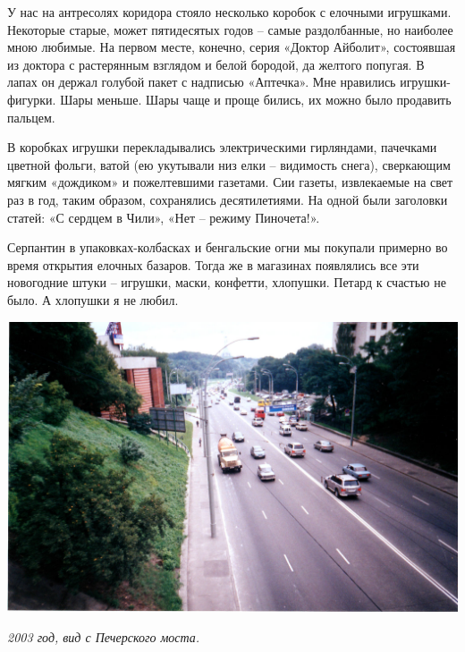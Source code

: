 У нас на антресолях коридора стояло несколько коробок с елочными игрушками. Некоторые старые, может пятидесятых годов – самые раздолбанные, но наиболее мною любимые. На первом месте, конечно, серия «Доктор Айболит», состоявшая из доктора с растерянным взглядом и белой бородой, да желтого попугая. В лапах он держал голубой пакет с надписью «Аптечка». Мне нравились игрушки-фигурки. Шары меньше. Шары чаще и проще бились, их можно было продавить пальцем.

В коробках игрушки перекладывались электрическими гирляндами, пачечками цветной фольги, ватой (ею укутывали низ елки – видимость снега), сверкающим мягким «дождиком» и пожелтевшими газетами. Сии газеты, извлекаемые на свет раз в год, таким образом, сохранялись десятилетиями. На одной были заголовки статей: «С сердцем в Чили», «Нет – режиму Пиночета!».

Серпантин в упаковках-колбасках и бенгальские огни мы покупали примерно во время открытия елочных базаров. Тогда же в магазинах появлялись все эти новогодние штуки – игрушки, маски, конфетти, хлопушки. Петард к счастью не было. А хлопушки я не любил.


\begin{center}
\includegraphics[width=\linewidth]{chast-vosp/zver/pech-most.jpg}

\textit{2003 год, вид с Печерского моста.}
\end{center}

